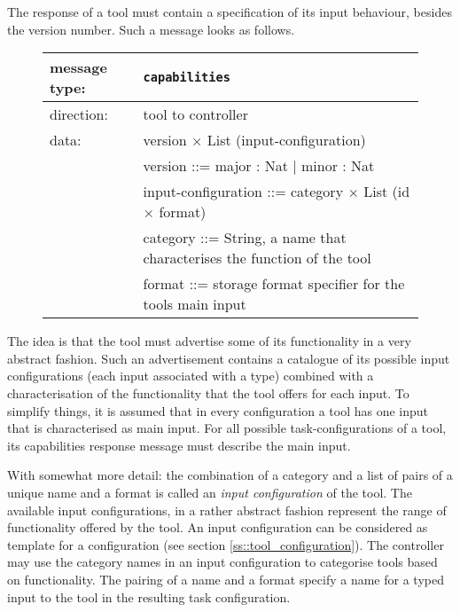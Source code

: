 \documentclass{article}
\newcommand{\msg}[1]{\texttt{#1}}
\begin{document}
   \noindent The response of a tool must contain a specification of its input
   behaviour, besides the version number. Such a message looks as follows.
   
   \begin{figure}[H]
    \begin{center}
     \begin{tabular}{|ll|}
      \hline
       message type:   & \msg{capabilities} \\
      \hline
       direction:      & tool to controller \\
       data:           & version $\times$ List (input-configuration) \\
                       &  version             ::= major : Nat $|$ minor : Nat \\
                       &  input-configuration ::= category $\times$ List (id $\times$ format) \\
                       &  category            ::= String,   a name that characterises the function of the tool \\
                       &  format              ::= storage format specifier for the tools main input \\
      \hline
     \end{tabular}
    \end{center}
   \end{figure}

   \noindent The idea is that the tool must advertise some of its functionality
   in a very abstract fashion. Such an advertisement contains a catalogue of
   its possible input configurations (each input associated with a type)
   combined with a characterisation of the functionality that the tool offers
   for each input.  To simplify things, it is assumed that in every
   configuration a tool has one input that is characterised as main input. For
   all possible task-configurations of a tool, its capabilities response
   message must describe the main input.
   
   With somewhat more detail: the combination of a category and a list of pairs
   of a unique name and a format is called an \textit{input configuration} of
   the tool.  The available input configurations, in a rather abstract fashion
   represent the range of functionality offered by the tool.  An input
   configuration can be considered as template for a configuration (see section
   \ref{ss::tool_configuration}).  The controller may use the category names in
   an input configuration to categorise tools based on functionality. The
   pairing of a name and a format specify a name for a typed input to the tool
   in the resulting task configuration.
\end{document}
